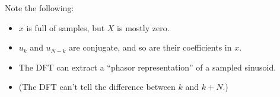 Note the following:
\begin{itemize}
  \item \(x\) is full of samples, but \(X\) is mostly zero.
  \item \(u_k\) and  \(u_{N - k}\) are conjugate, and so are their coefficients in \(x\).
  \item The DFT can extract a ``phasor representation'' of a sampled sinusoid.
  \item (The DFT can't tell the difference between \(k\) and \(k + N\).)
\end{itemize}
